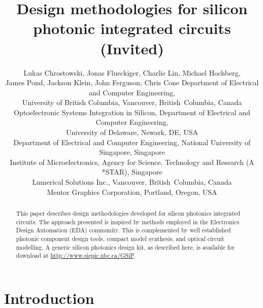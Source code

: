 \documentclass[journal]{spie}
\begin{document}
\title{Design methodologies for silicon photonic integrated circuits \\
(Invited)}

\author{Lukas Chrostowski, 
Jonas Flueckiger,
Charlie Lin,
Michael Hochberg, \\
James Pond, 
Jackson Klein,
John Ferguson,
Chris Cone
\skiplinehalf
{}Department of Electrical and Computer Engineering, \\
University of British Columbia, Vancouver, British~Columbia, Canada \\
Optoelectronic Systems Integration in Silicon, Department of Electrical and Computer Engineering, \\
University of Delaware, Newark, DE, USA  \\
Department of Electrical and Computer Engineering, National University of Singapore, Singapore \\
Institute of Microelectronics, Agency for Science, Technology and Research (A *STAR), Singapore \\
Lumerical Solutions Inc.,  Vancouver, British~Columbia, Canada \\
Mentor Graphics Corporation, Portland, Oregon, USA
}

\maketitle

\begin{abstract}

This paper describes design methodologies developed for silicon photonics integrated circuits.  The approach presented is inspired by methods employed in the Electronics Design Automation (EDA) community.  This is complemented by well established photonic component design tools, compact model synthesis, and optical circuit modelling.   A generic silicon photonics design kit, as described here, is available for download at \url{http://www.siepic.ubc.ca/GSiP}.

\end{abstract}



\section{Introduction}\label{sec1}
\end{document}
